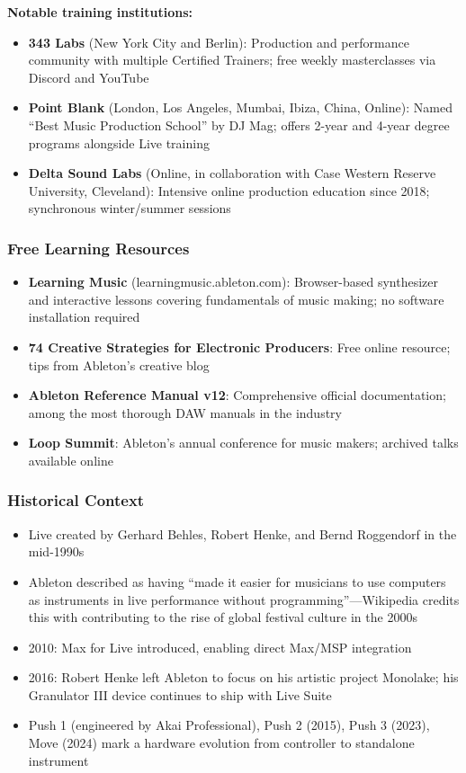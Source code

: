 \documentclass[11pt,letterpaper]{article}
\begin{document}
\textbf{Notable training institutions:}
\begin{itemize}[leftmargin=1.5em]
  \item \textbf{343 Labs} (New York City and Berlin): Production and performance community with
  multiple Certified Trainers; free weekly masterclasses via Discord and YouTube
  \item \textbf{Point Blank} (London, Los Angeles, Mumbai, Ibiza, China, Online): Named
  ``Best Music Production School'' by DJ Mag; offers 2-year and 4-year degree programs
  alongside Live training
  \item \textbf{Delta Sound Labs} (Online, in collaboration with Case Western Reserve University,
  Cleveland): Intensive online production education since 2018; synchronous winter/summer sessions
\end{itemize}

\subsubsection{Free Learning Resources}

\begin{itemize}[leftmargin=1.5em]
  \item \textbf{Learning Music} (learningmusic.ableton.com): Browser-based synthesizer and
  interactive lessons covering fundamentals of music making; no software installation required
  \item \textbf{74 Creative Strategies for Electronic Producers}: Free online resource; tips
  from Ableton's creative blog
  \item \textbf{Ableton Reference Manual v12}: Comprehensive official documentation; among the
  most thorough DAW manuals in the industry
  \item \textbf{Loop Summit}: Ableton's annual conference for music makers; archived talks
  available online
\end{itemize}

\subsubsection{Historical Context}

\begin{itemize}[leftmargin=1.5em]
  \item Live created by Gerhard Behles, Robert Henke, and Bernd Roggendorf in the mid-1990s
  \item Ableton described as having ``made it easier for musicians to use computers as instruments
  in live performance without programming''---Wikipedia credits this with contributing to the
  rise of global festival culture in the 2000s
  \item 2010: Max for Live introduced, enabling direct Max/MSP integration
  \item 2016: Robert Henke left Ableton to focus on his artistic project Monolake; his
  Granulator III device continues to ship with Live Suite
  \item Push 1 (engineered by Akai Professional), Push 2 (2015), Push 3 (2023), Move (2024)
  mark a hardware evolution from controller to standalone instrument
\end{itemize}
\end{document}
